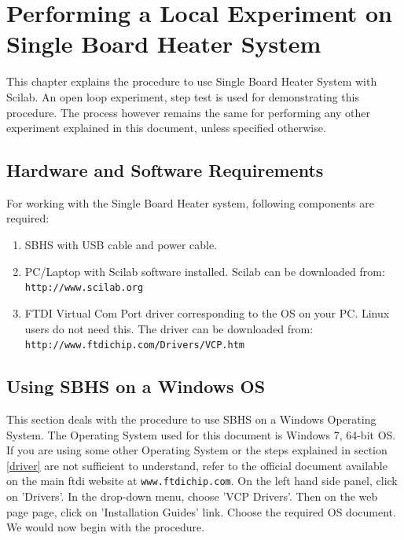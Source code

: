 \chapter{Performing a Local Experiment on Single Board Heater System}\label{sercomm}
This chapter explains the procedure to use Single Board Heater System with Scilab. An open loop experiment, step test is used for demonstrating this procedure. The process however remains the same for performing any other experiment explained in this document, unless specified otherwise. 
\section*{Hardware and Software Requirements}\label{umlauts}
For working with the Single Board Heater system, following components are required:

\begin{enumerate}
\item SBHS with USB cable and power cable.
\item PC/Laptop with Scilab software installed. Scilab can be downloaded from:\\ {\tt http://www.scilab.org}
\item FTDI Virtual Com Port driver corresponding to the OS on your PC. Linux users do not need this. The driver can be downloaded from:\\
{\tt http://www.ftdichip.com/Drivers/VCP.htm}

\end{enumerate}


\section{Using SBHS on a Windows OS}
\label{win_procedure}
This section deals with the procedure to use SBHS on a Windows Operating System. The Operating System used for this document is Windows 7, 64-bit OS. If you are using some other Operating System or the steps explained in section \ref{driver} are not sufficient to understand, refer to the official document available on the main ftdi website at {\tt www.ftdichip.com}. On the left hand side panel, click on 'Drivers'. In the drop-down menu, choose 'VCP Drivers'. Then on the web page page, click on 'Installation Guides' link. Choose the required OS document. We would now begin with the procedure.
